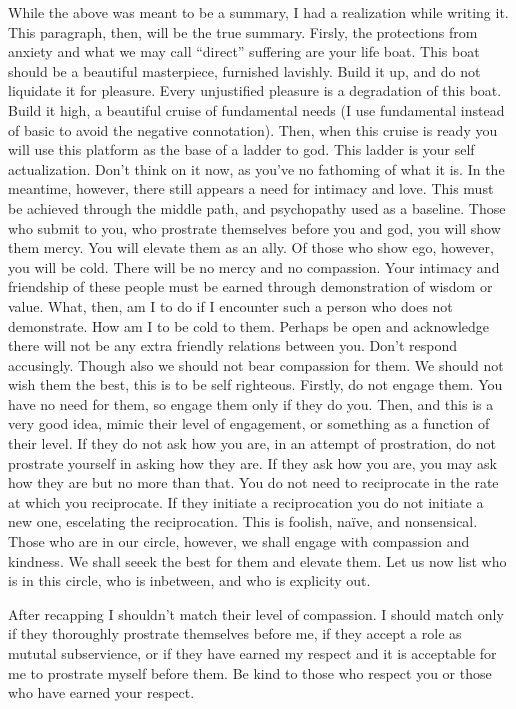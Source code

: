 \qquad While the above was meant to be a summary, I had a realization
while writing it. This paragraph, then, will be the true summary.
Firsly, the protections from anxiety and what we may call ``direct''
suffering are your life boat. This boat should be a beautiful
masterpiece, furnished lavishly. Build it up, and do not liquidate it
for pleasure. Every unjustified pleasure is a degradation of this boat.
Build it high, a beautiful cruise of fundamental needs (I use
fundamental instead of basic to avoid the negative connotation). Then,
when this cruise is ready you will use this platform as the base of a
ladder to god. This ladder is your self actualization. Don't think on it
now, as you've no fathoming of what it is. In the meantime, however,
there still appears a need for intimacy and love. This must be achieved
through the middle path, and psychopathy used as a baseline. Those who
submit to you, who prostrate themselves before you and god, you will
show them mercy. You will elevate them as an ally. Of those who show
ego, however, you will be cold. There will be no mercy and no
compassion. Your intimacy and friendship of these people must be earned
through demonstration of wisdom or value. What, then, am I to do if I
encounter such a person who does not demonstrate. How am I to be cold to
them. Perhaps be open and acknowledge there will not be any extra
friendly relations between you. Don't respond accusingly. Though also we
should not bear compassion for them. We should not wish them the best,
this is to be self righteous. Firstly, do not engage them. You have no
need for them, so engage them only if they do you. Then, and this is a
very good idea, mimic their level of engagement, or something as a
function of their level. If they do not ask how you are, in an attempt
of prostration, do not prostrate yourself in asking how they are. If
they ask how you are, you may ask how they are but no more than that.
You do not need to reciprocate in the rate at which you reciprocate. If
they initiate a reciprocation you do not initiate a new one, escelating
the reciprocation. This is foolish, naïve, and nonsensical. Those who
are in our circle, however, we shall engage with compassion and
kindness. We shall seeek the best for them and elevate them. Let us now
list who is in this circle, who is inbetween, and who is explicity out.

\qquad After recapping I shouldn't match their level of compassion. I
should match only if they thoroughly prostrate themselves before me, if
they accept a role as mututal subservience, or if they have earned my
respect and it is acceptable for me to prostrate myself before them. Be
kind to those who respect you or those who have earned your respect.

